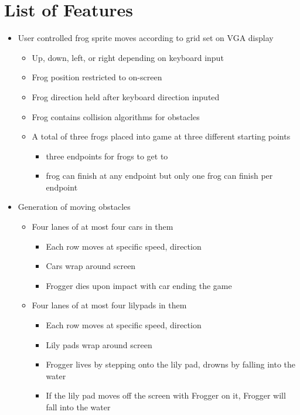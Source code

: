 \documentclass[journal, twocolumn, final,11pt,letterpaper]{IEEEtran}
\begin{document}
\section{List of Features}
\begin{itemize}
	\item User controlled frog sprite moves according to grid set on VGA display
	\begin{itemize}
		\item Up, down, left, or right depending on keyboard input
		\item Frog position restricted to on-screen
		\item Frog direction held after keyboard direction inputed
		\item Frog contains collision algorithms for obstacles 
		\item A total of three frogs placed into game at three different starting points
		\begin{itemize}
			\item three endpoints for frogs to get to
			\item frog can finish at any endpoint but only one frog can finish per endpoint 
		\end{itemize} 
	\end{itemize}
	\item Generation of moving obstacles
	\begin{itemize}
		\item Four lanes of at most four cars in them 
		\begin{itemize}
				\item Each row moves at specific speed, direction
				\item Cars wrap around screen
				\item Frogger dies upon impact with car ending the game
		\end{itemize}
		\item Four lanes of at most four lilypads in them
		\begin{itemize}
			\item Each row moves at specific speed, direction
			\item Lily pads wrap around screen
			\item Frogger lives by stepping onto the lily pad, drowns by falling into the water
			\item If the lily pad moves off the screen with Frogger on it, Frogger will fall into the water
		\end{itemize}
	\end{itemize}


\end{itemize}
\end{document}
